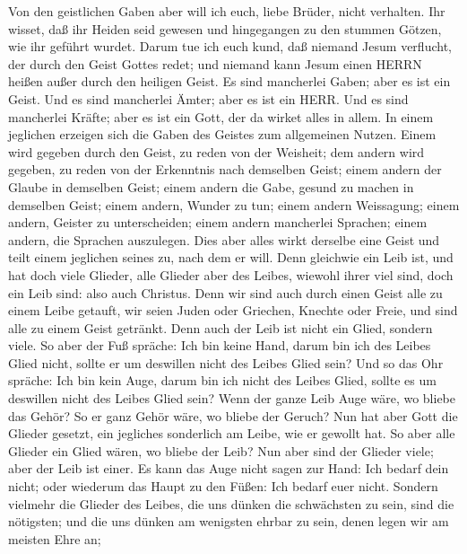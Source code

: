  Von den geistlichen Gaben aber will ich euch, liebe Brüder,
nicht verhalten.  Ihr wisset, daß ihr Heiden seid gewesen
und hingegangen zu den stummen Götzen, wie ihr geführt wurdet.
 Darum tue ich euch kund, daß niemand Jesum verflucht, der
durch den Geist Gottes redet; und niemand kann Jesum einen HERRN heißen
außer durch den heiligen Geist.  Es sind mancherlei Gaben;
aber es ist ein Geist.  Und es sind mancherlei Ämter; aber
es ist ein HERR.  Und es sind mancherlei Kräfte; aber es ist
ein Gott, der da wirket alles in allem.  In einem jeglichen
erzeigen sich die Gaben des Geistes zum allgemeinen Nutzen. 
Einem wird gegeben durch den Geist, zu reden von der Weisheit; dem
andern wird gegeben, zu reden von der Erkenntnis nach demselben Geist;
 einem andern der Glaube in demselben Geist; einem andern
die Gabe, gesund zu machen in demselben Geist;  einem
andern, Wunder zu tun; einem andern Weissagung; einem andern, Geister zu
unterscheiden; einem andern mancherlei Sprachen; einem andern, die
Sprachen auszulegen.  Dies aber alles wirkt derselbe eine
Geist und teilt einem jeglichen seines zu, nach dem er will.
 Denn gleichwie ein Leib ist, und hat doch viele Glieder,
alle Glieder aber des Leibes, wiewohl ihrer viel sind, doch ein Leib
sind: also auch Christus.  Denn wir sind auch durch einen
Geist alle zu einem Leibe getauft, wir seien Juden oder Griechen,
Knechte oder Freie, und sind alle zu einem Geist getränkt. 
Denn auch der Leib ist nicht ein Glied, sondern viele.  So
aber der Fuß spräche: Ich bin keine Hand, darum bin ich des Leibes Glied
nicht, sollte er um deswillen nicht des Leibes Glied sein? 
Und so das Ohr spräche: Ich bin kein Auge, darum bin ich nicht des
Leibes Glied, sollte es um deswillen nicht des Leibes Glied sein?
 Wenn der ganze Leib Auge wäre, wo bliebe das Gehör? So er
ganz Gehör wäre, wo bliebe der Geruch?  Nun hat aber Gott
die Glieder gesetzt, ein jegliches sonderlich am Leibe, wie er gewollt
hat.  So aber alle Glieder ein Glied wären, wo bliebe der
Leib?  Nun aber sind der Glieder viele; aber der Leib ist
einer.  Es kann das Auge nicht sagen zur Hand: Ich bedarf
dein nicht; oder wiederum das Haupt zu den Füßen: Ich bedarf euer nicht.
 Sondern vielmehr die Glieder des Leibes, die uns dünken
die schwächsten zu sein, sind die nötigsten;  und die uns
dünken am wenigsten ehrbar zu sein, denen legen wir am meisten Ehre an;
